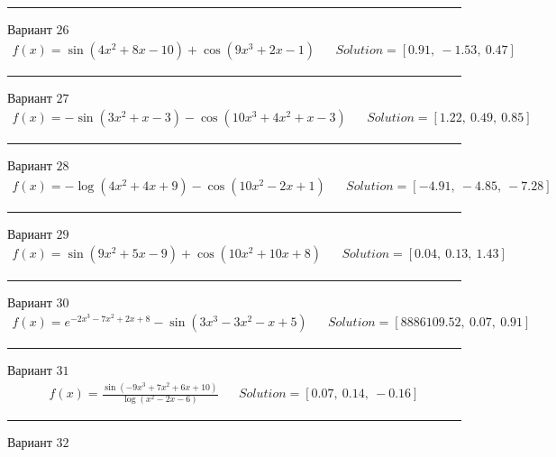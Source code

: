 \documentclass[11pt]{report}
\begin{document}
\begin{center}
    \noindent\rule{8cm}{0.4pt}
\end{center}
Вариант \(26\)
\begin{align*}
    f(x) = \sin{\left(4 x^{2} + 8 x - 10 \right)} + \cos{\left(9 x^{3} + 2 x - 1 \right)} && Solution = \left[ 0.91, \  -1.53, \  0.47\right]
\end{align*}
\begin{center}
    \noindent\rule{8cm}{0.4pt}
\end{center}
Вариант \(27\)
\begin{align*}
    f(x) = - \sin{\left(3 x^{2} + x - 3 \right)} - \cos{\left(10 x^{3} + 4 x^{2} + x - 3 \right)} && Solution = \left[ 1.22, \  0.49, \  0.85\right]
\end{align*}
\begin{center}
    \noindent\rule{8cm}{0.4pt}
\end{center}
Вариант \(28\)
\begin{align*}
    f(x) = - \log{\left(4 x^{2} + 4 x + 9 \right)} - \cos{\left(10 x^{2} - 2 x + 1 \right)} && Solution = \left[ -4.91, \  -4.85, \  -7.28\right]
\end{align*}
\begin{center}
    \noindent\rule{8cm}{0.4pt}
\end{center}
Вариант \(29\)
\begin{align*}
    f(x) = \sin{\left(9 x^{2} + 5 x - 9 \right)} + \cos{\left(10 x^{2} + 10 x + 8 \right)} && Solution = \left[ 0.04, \  0.13, \  1.43\right]
\end{align*}
\begin{center}
    \noindent\rule{8cm}{0.4pt}
\end{center}
Вариант \(30\)
\begin{align*}
    f(x) = e^{- 2 x^{3} - 7 x^{2} + 2 x + 8} - \sin{\left(3 x^{3} - 3 x^{2} - x + 5 \right)} && Solution = \left[ 8886109.52, \  0.07, \  0.91\right]
\end{align*}
\begin{center}
    \noindent\rule{8cm}{0.4pt}
\end{center}
Вариант \(31\)
\begin{align*}
    f(x) = \frac{\sin{\left(- 9 x^{3} + 7 x^{2} + 6 x + 10 \right)}}{\log{\left(x^{2} - 2 x - 6 \right)}} && Solution = \left[ 0.07, \  0.14, \  -0.16\right]
\end{align*}
\begin{center}
    \noindent\rule{8cm}{0.4pt}
\end{center}
Вариант \(32\)
\end{document}
